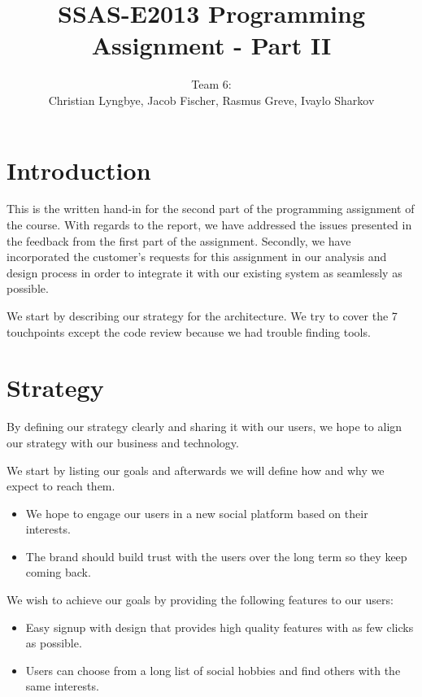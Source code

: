 \documentclass[a4paper]{article}
\title{SSAS-E2013 Programming Assignment - Part II}
\author{Team 6:\\Christian Lyngbye, Jacob Fischer, Rasmus Greve, Ivaylo Sharkov}
\begin{document}
\maketitle

\tableofcontents

\newpage
\section{Introduction}
This is the written hand-in for the second part of the programming assignment of the course. With regards to the report, we have addressed the issues presented in the feedback from the first part of the assignment. Secondly, we have incorporated the customer's requests for this assignment in our analysis and design process in order to integrate it with our existing system as seamlessly as possible.

We start by describing our strategy for the architecture. We try to cover the 7 touchpoints except the code review because we had trouble finding tools. 

\section{Strategy}
By defining our strategy clearly and sharing it with our users, we hope to align our strategy with our business and technology.

We start by listing our goals and afterwards we will define how and why we expect to reach them.

\begin{itemize}
\item
We hope to engage our users in a new social platform based on their interests.
\item
The brand should build trust with the users over the long term so they keep coming back.
\end{itemize}

We wish to achieve our goals by providing the following features to our users:
\begin{itemize}
\item Easy signup with design that provides high quality features with as few clicks as possible.
\item Users can choose from a long list of social hobbies and find others with the same interests.
\end{itemize}
\end{document}
